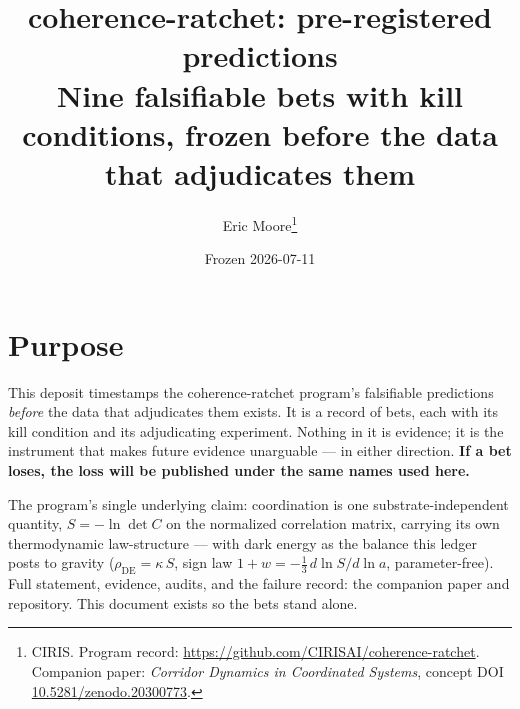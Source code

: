 \documentclass[11pt]{article}
\title{\textbf{coherence-ratchet: pre-registered predictions}\\
\large Nine falsifiable bets with kill conditions, frozen before the data that adjudicates them}
\author{Eric Moore\thanks{CIRIS. Program record: \url{https://github.com/CIRISAI/coherence-ratchet}. Companion paper: \emph{Corridor Dynamics in Coordinated Systems}, concept DOI \href{https://doi.org/10.5281/zenodo.20300773}{10.5281/zenodo.20300773}.}}
\date{Frozen 2026-07-11}
\begin{document}
\maketitle

\section*{Purpose}
This deposit timestamps the coherence-ratchet program's falsifiable predictions
\emph{before} the data that adjudicates them exists. It is a record of bets, each with its
kill condition and its adjudicating experiment. Nothing in it is evidence; it is the
instrument that makes future evidence unarguable --- in either direction.
\textbf{If a bet loses, the loss will be published under the same names used here.}

The program's single underlying claim: coordination is one substrate-independent quantity,
$S = -\ln\det C$ on the normalized correlation matrix, carrying its own thermodynamic
law-structure --- with dark energy as the balance this ledger posts to gravity
($\rho_{\mathrm{DE}} = \kappa\, S$, sign law $1 + w = -\tfrac13\, d\ln S / d\ln a$,
parameter-free). Full statement, evidence, audits, and the failure record: the companion
paper and repository. This document exists so the bets stand alone.
\end{document}
